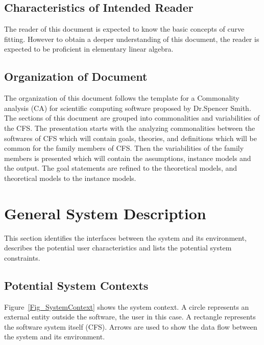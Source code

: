 \documentclass[12pt]{article}
\newcommand{\famname}{CFS} %
\begin{document}
 

\subsection{Characteristics of Intended Reader} 
The reader of this document is expected to know the basic concepts of curve fitting. However to obtain a deeper understanding of this document, the reader is expected to be proficient in elementary linear algebra.

\subsection{Organization of Document}
The organization of this document follows the template for a Commonality analysis (CA) for scientific computing software proposed by Dr.Spencer Smith.  The sections of this document are grouped into commonalities and variabilities of the \famname{}. The presentation starts with the analyzing commonalities between the softwares of \famname{} which will contain goals, theories,  and definitions which will be common for the family members of \famname{}. Then the variabilities of the family members is presented which will contain the assumptions, instance models and the output. The goal statements are refined to the theoretical models, and theoretical models to the instance models.

\section{General System Description}

This section identifies the interfaces between the system and its environment,
describes the potential user characteristics and lists the potential system
constraints.

\subsection{Potential System Contexts}

Figure~\ref{Fig_SystemContext} shows the system context.  A circle represents an
external entity outside the software, the user in this case.  A rectangle
represents the software system itself (\famname{}).  Arrows are used to show
the data
flow between the system and its environment.
\end{document}
